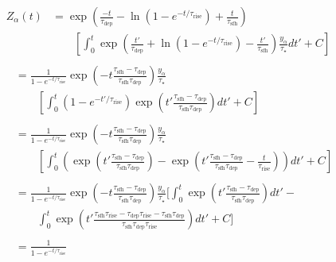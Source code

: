 \documentclass[12pt]{article}
\newcommand{\timescale}[1]{\ensuremath{\tau_\text{#1}}}
\begin{document}
\begin{subequations}\begin{align}
\begin{split} %
Z_\alpha(t) &= \exp\left(
\frac{-t}{\timescale{dep}} - \ln (1 - e^{-t / \timescale{rise}}) +
\frac{t}{\timescale{sfh}}
\right)
\\
&\qquad \left[
\int_0^t \exp\left(
\frac{t'}{\timescale{dep}} + \ln (1 - e^{-t / \timescale{rise}}) -
\frac{t'}{\timescale{sfh}}
\right)
\frac{y_\alpha}{\tau_\star} dt' + C
\right]
\end{split}
\\
\begin{split} %
&= \frac{1}{1 - e^{-t / \timescale{rise}}}
\exp \left(-t\frac{
	\timescale{sfh} - \timescale{dep}
}{
	\timescale{sfh}\timescale{dep}
}\right) \frac{y_\alpha}{\tau_\star}
\\
&\qquad \left[ \int_0^t (1 - e^{-t' / \timescale{rise}}) \exp \left(
t' \frac{\timescale{sfh} - \timescale{dep}}{\timescale{sfh} \timescale{dep}}
\right)dt' + C\right]
\end{split}
\\
\begin{split} %
&= \frac{1}{1 - e^{-t / \timescale{rise}}}
\exp \left(-t\frac{
	\timescale{sfh} - \timescale{dep}
}{
	\timescale{sfh}\timescale{dep}
}\right) \frac{y_\alpha}{\tau_\star}
\\
&\qquad \left[ \int_0^t \left(
\exp\left(t' \frac{
	\timescale{sfh} - \timescale{dep}
}{
	\timescale{sfh}\timescale{dep}
}\right)
- \exp\left(
t' \frac{
	\timescale{sfh} - \timescale{dep}
}{
	\timescale{sfh}\timescale{dep}
} - \frac{t}{\timescale{rise}}
\right)
\right) dt' + C\right]
\end{split}
\\
\begin{split} %
&= \frac{1}{1 - e^{-t / \timescale{rise}}}
\exp \left(-t\frac{
	\timescale{sfh} - \timescale{dep}
}{
	\timescale{sfh}\timescale{dep}
}\right) \frac{y_\alpha}{\tau_\star} \bigg[ \int_0^t
\exp\left(t'\frac{
	\timescale{sfh} - \timescale{dep}
}{
	\timescale{sfh}\timescale{dep}
} \right) dt' -
\\
&\qquad
\int_0^t \exp\left(t'\frac{
	\timescale{sfh}\timescale{rise} - \timescale{dep}\timescale{rise} -
	\timescale{sfh}\timescale{dep}
}{
	\timescale{sfh}\timescale{dep}\timescale{rise}
}\right) dt' + C \bigg]
\end{split}
\\
\begin{split} %
&= \frac{1}{1 - e^{-t / \timescale{rise}}}

\end{split}
\end{align}
\end{subequations}
\end{document}
